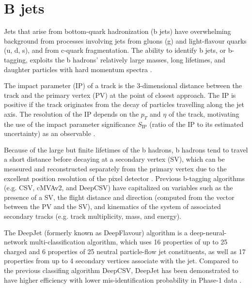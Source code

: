 \section{B jets}
Jets that arise from bottom-quark hadronization (b jets) have overwhelming background from processes involving jets from gluons (g) and light-flavour quarks (u, d, s), and from c-quark fragmentation. The ability to identify b jets, or b-tagging, exploits the b hadrons' relatively large masses, long lifetimes, and daughter particles with hard momentum spectra \cite{CMS-BTV-12-001}. 

The impact parameter (IP) of a track is the 3-dimensional distance between the track and the primary vertex (PV) at the point of closest approach. The IP is positive if the track originates from the decay of particles travelling along the jet axis. The resolution of the IP depends on the $p_{T}$ and $\eta$ of the track, motivating the use of the impact parameter significance $S_{\text{IP}}$ (ratio of the IP to its estimated uncertainty) as an observable \cite{CMS-BTV-12-001}.

Because of the large but finite lifetimes of the b hadrons, b hadrons tend to travel a short distance before decaying at a secondary vertex (SV), which can be measured and reconstructed separately from the primary vertex due to the excellent position resolution of the pixel detector \cite{CMS-BTV-12-001}. Previous b-tagging algorithms (e.g. CSV, cMVAv2, and DeepCSV) have capitalized on variables such as the presence of a SV, the flight distance and direction (computed from the vector between the PV and the SV), and kinematics of the system of associated secondary tracks (e.g. track multiplicity, mass, and energy). 

The DeepJet (formerly known as DeepFlavour) algorithm \cite{CMS-DP-2017-013} is a deep-neural-network multi-classification algorithm, which uses 16 properties of up to 25 charged and 6 properties of 25 neutral particle-flow jet constituents, as well as 17 properties from up to 4 secondary vertices associate with the jet. Compared to the previous classifing algorithm DeepCSV, DeepJet has been demonstrated to have higher efficiency with lower mis-identification probability in Phase-1 data \cite{CMS-DP-2018-058}. 